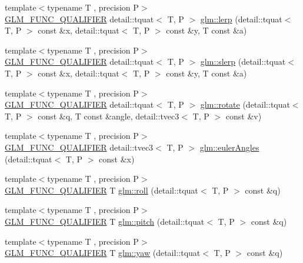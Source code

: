 \begin{DoxyCompactItemize}
{\footnotesize template$<$typename T , precision P$>$ }\\\hyperlink{setup_8hpp_a33fdea6f91c5f834105f7415e2a64407}{G\+L\+M\+\_\+\+F\+U\+N\+C\+\_\+\+Q\+U\+A\+L\+I\+F\+I\+ER} detail\+::tquat$<$ T, P $>$ \hyperlink{group__gtc__quaternion_gafc1c989eaa2c786d34218b176f680fe0}{glm\+::lerp} (detail\+::tquat$<$ T, P $>$ const \&x, detail\+::tquat$<$ T, P $>$ const \&y, T const \&a)
\item 
{\footnotesize template$<$typename T , precision P$>$ }\\\hyperlink{setup_8hpp_a33fdea6f91c5f834105f7415e2a64407}{G\+L\+M\+\_\+\+F\+U\+N\+C\+\_\+\+Q\+U\+A\+L\+I\+F\+I\+ER} detail\+::tquat$<$ T, P $>$ \hyperlink{group__gtc__quaternion_ga7468a211a20ea56ea5cfb0625226868a}{glm\+::slerp} (detail\+::tquat$<$ T, P $>$ const \&x, detail\+::tquat$<$ T, P $>$ const \&y, T const \&a)
\item 
{\footnotesize template$<$typename T , precision P$>$ }\\\hyperlink{setup_8hpp_a33fdea6f91c5f834105f7415e2a64407}{G\+L\+M\+\_\+\+F\+U\+N\+C\+\_\+\+Q\+U\+A\+L\+I\+F\+I\+ER} detail\+::tquat$<$ T, P $>$ \hyperlink{group__gtc__quaternion_gaa9a8891f03d8f5373525c4b3159c1c73}{glm\+::rotate} (detail\+::tquat$<$ T, P $>$ const \&q, T const \&angle, detail\+::tvec3$<$ T, P $>$ const \&v)
\item 
{\footnotesize template$<$typename T , precision P$>$ }\\\hyperlink{setup_8hpp_a33fdea6f91c5f834105f7415e2a64407}{G\+L\+M\+\_\+\+F\+U\+N\+C\+\_\+\+Q\+U\+A\+L\+I\+F\+I\+ER} detail\+::tvec3$<$ T, P $>$ \hyperlink{group__gtc__quaternion_gade4034f49ccadf63cb31a7fb5fa3c8aa}{glm\+::euler\+Angles} (detail\+::tquat$<$ T, P $>$ const \&x)
\item 
{\footnotesize template$<$typename T , precision P$>$ }\\\hyperlink{setup_8hpp_a33fdea6f91c5f834105f7415e2a64407}{G\+L\+M\+\_\+\+F\+U\+N\+C\+\_\+\+Q\+U\+A\+L\+I\+F\+I\+ER} T \hyperlink{group__gtc__quaternion_ga6d883e423bc425f4334fcce202131f7e}{glm\+::roll} (detail\+::tquat$<$ T, P $>$ const \&q)
\item 
{\footnotesize template$<$typename T , precision P$>$ }\\\hyperlink{setup_8hpp_a33fdea6f91c5f834105f7415e2a64407}{G\+L\+M\+\_\+\+F\+U\+N\+C\+\_\+\+Q\+U\+A\+L\+I\+F\+I\+ER} T \hyperlink{group__gtc__quaternion_ga4d345dc369a54f53f5ebc375bac56d11}{glm\+::pitch} (detail\+::tquat$<$ T, P $>$ const \&q)
\item 
{\footnotesize template$<$typename T , precision P$>$ }\\\hyperlink{setup_8hpp_a33fdea6f91c5f834105f7415e2a64407}{G\+L\+M\+\_\+\+F\+U\+N\+C\+\_\+\+Q\+U\+A\+L\+I\+F\+I\+ER} T \hyperlink{group__gtc__quaternion_ga1de7653ddf380ff06d2300eea831664c}{glm\+::yaw} (detail\+::tquat$<$ T, P $>$ const \&q)

\end{DoxyCompactItemize}
